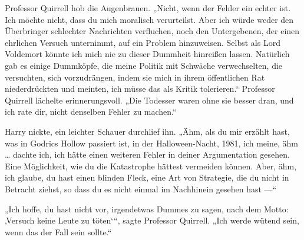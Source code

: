 Professor Quirrell hob die Augenbrauen.
„Nicht, wenn der Fehler ein echter ist. Ich möchte nicht, dass du mich moralisch verurteilst. Aber ich würde weder den Überbringer schlechter Nachrichten verfluchen, noch den Untergebenen, der einen ehrlichen Versuch unternimmt, auf ein Problem hinzuweisen. Selbst als Lord Voldemort könnte ich mich nie zu dieser Dummheit hinreißen lassen. Natürlich gab es einige Dummköpfe, die meine Politik mit Schwäche verwechselten, die versuchten, sich vorzudrängen, indem sie mich in ihrem öffentlichen Rat niederdrückten und meinten, ich müsse das als Kritik tolerieren.“
Professor Quirrell lächelte erinnerungsvoll.
„Die Todesser waren ohne sie besser dran, und ich rate dir, nicht denselben Fehler zu machen.“

Harry nickte, ein leichter Schauer durchlief ihn.
„Ähm, als du mir erzählt hast, was in Godrics Hollow passiert ist, in der Halloween-Nacht, 1981, ich meine, ähm … dachte ich, ich hätte einen weiteren Fehler in deiner Argumentation gesehen. Eine Möglichkeit, wie du die Katastrophe hättest vermeiden können. Aber, ähm, ich glaube, du hast einen blinden Fleck, eine Art von Strategie, die du nicht in Betracht ziehst, so dass du es nicht einmal im Nachhinein gesehen hast —“

„Ich hoffe, du hast nicht vor, irgendetwas Dummes zu sagen, nach dem Motto: ‚Versuch keine Leute zu töten‘“, sagte Professor Quirrell.
„Ich werde wütend sein, wenn das der Fall sein sollte.“

